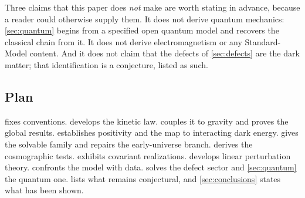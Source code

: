 Three claims that this paper does \emph{not} make are worth stating in advance,
because a reader could otherwise supply them. It does not derive quantum
mechanics: \cref{sec:quantum} begins from a specified open quantum model and
recovers the classical chain from it. It does not derive electromagnetism or
any Standard-Model content. And it does not claim that the defects of
\cref{sec:defects} are the dark matter; that identification is a conjecture,
listed as such.

\subsection{Plan}\label{sec:intro-plan}

 fixes conventions.
 develops the kinetic law.
 couples it to gravity and proves the global
results.  establishes positivity and the map to
interacting dark energy.  gives the solvable family
and repairs the early-universe branch.  derives the
cosmographic tests.  exhibits covariant realizations.
 develops linear perturbation theory.
 confronts the model with data.
 solves the defect sector and \cref{sec:quantum} the quantum
one.  lists what remains conjectural, and
\cref{sec:conclusions} states what has been shown.
